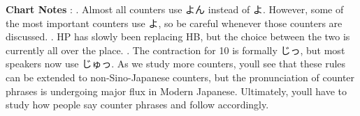 \par{\textbf{Chart Notes }: \hfill{}. Almost all counters use よん instead of よ. However, some of the most important counters use よ, so be careful whenever those counters are discussed. \hfill{}. H\textrightarrow P has slowly been replacing H\textrightarrow B, but the choice between the two is currently all over the place. \hfill{}. The contraction for 10 is formally じっ, but most speakers now use じゅっ. }
As we study more counters, you\textquotesingle ll see that these rules can be extended to non-Sino-Japanese counters, but the pronunciation of counter phrases is undergoing major flux in Modern Japanese. Ultimately, you\textquotesingle ll have to study how people say counter phrases and follow accordingly.     